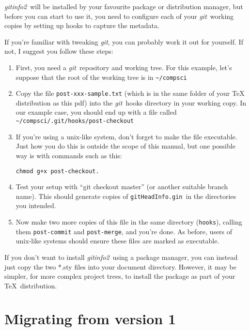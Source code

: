 \documentclass[a4paper,12pt,twoside,openany]{memoir}
\newcommand{\sfit}[1]{\textit{#1}}
\newcommand{\git}{\sfit{git}}
\newcommand{\tpname}{\sfit{gitinfo2}}
\newcommand{\ginname}{gitHeadInfo.gin}
\newcommand{\metaname}{\texttt{\ginname}}
\begin{document}
\tpname\ will be installed by your favourite package or distribution manager,
but before you can start to use it,
you need to configure each of your \git\ working copies
by setting up hooks to capture the metadata.

If you're familiar with tweaking \git, you can probably work it out for yourself.
If not, I suggest you follow these steps:

\begin{enumerate}

\item First, you need a \git\ repository and working tree.
For this example, let's suppose that the root of the working tree is in
\texttt{\textasciitilde/compsci}

\item Copy the file \texttt{post-xxx-sample.txt}
(which is in the same folder of your \TeX{} distribution as this pdf) 
into the \git\ hooks directory in your working copy.
In our example case, you should end up with a file called
\texttt{\textasciitilde/compsci/.git/hooks/post-checkout}

\item If you're using a unix-like system,
don't forget to make the file executable.
Just how you do this is outside the scope of this manual,
but one possible way is with commands such as this:

\begin{verbatim}
chmod g+x post-checkout.
\end{verbatim}

\item Test your setup with ``git checkout master''
(or another suitable branch name).
This should generate copies of \metaname\ in the directories
you intended.

\item Now make two more copies of this file in the same directory (\texttt{hooks}), calling them
\texttt{post-commit} and \texttt{post-merge}, and you're done.
As before, users of unix-like systems should ensure these files are marked as executable.
\end{enumerate}

If you don't want to install \tpname\ using a package manager,
you can instead just copy the two *.sty files into your document directory.
However, it may be simpler, for more complex project trees,
to install the package as part of your \TeX\ distribution.

\section{Migrating from version 1}
\end{document}
